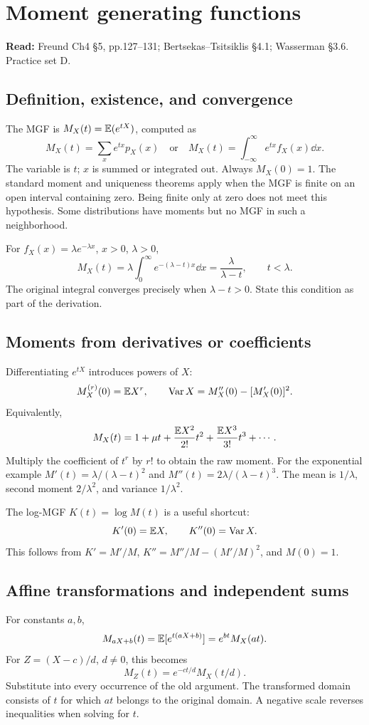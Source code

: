 \section{Moment generating functions}
\textbf{Read:} Freund Ch4 \S5, pp.127--131; Bertsekas--Tsitsiklis \S4.1; Wasserman \S3.6. Practice set D.
\subsection{Definition, existence, and convergence}
The MGF is $M_X(t)=\mathbb E(e^{tX})$, computed as
\[
M_X(t)=\sum_xe^{tx}p_X(x)\quad\text{or}\quad M_X(t)=\int_{-\infty}^{\infty}e^{tx}f_X(x)\dd x.
\]
The variable is $t$; $x$ is summed or integrated out. Always $M_X(0)=1$. The standard moment and uniqueness theorems apply when the MGF is finite on an open interval containing zero. Being finite only at zero does not meet this hypothesis. Some distributions have moments but no MGF in such a neighborhood.
\begin{example}
For $f_X(x)=\lambda e^{-\lambda x}$, $x>0$, $\lambda>0$,
\[
M_X(t)=\lambda\int_0^\infty e^{-(\lambda-t)x}\dd x=\frac{\lambda}{\lambda-t},\qquad t<\lambda.
\]
The original integral converges precisely when $\lambda-t>0$. State this condition as part of the derivation.
\end{example}
\subsection{Moments from derivatives or coefficients}
Differentiating $e^{tX}$ introduces powers of $X$:
\[
M_X^{(r)}(0)=\mathbb E X^r,\qquad\operatorname{Var} X=M_X''(0)-[M_X'(0)]^2.
\]
Equivalently,
\[
M_X(t)=1+\mu t+\frac{\mathbb E X^2}{2!}t^2+\frac{\mathbb E X^3}{3!}t^3+\cdots.
\]
Multiply the coefficient of $t^r$ by $r!$ to obtain the raw moment. For the exponential example $M'(t)=\lambda/(\lambda-t)^2$ and $M''(t)=2\lambda/(\lambda-t)^3$. The mean is $1/\lambda$, second moment $2/\lambda^2$, and variance $1/\lambda^2$.

The log-MGF $K(t)=\log M(t)$ is a useful shortcut:
\[
K'(0)=\mathbb E X,\qquad K''(0)=\operatorname{Var} X.
\]
This follows from $K'=M'/M$, $K''=M''/M-(M'/M)^2$, and $M(0)=1$.
\subsection{Affine transformations and independent sums}
For constants $a,b$,
\[
M_{aX+b}(t)=\mathbb E[e^{t(aX+b)}]=e^{bt}M_X(at).
\]
For $Z=(X-c)/d$, $d\ne0$, this becomes
\[
M_Z(t)=e^{-ct/d}M_X(t/d).
\]
Substitute into every occurrence of the old argument. The transformed domain consists of $t$ for which $at$ belongs to the original domain. A negative scale reverses inequalities when solving for $t$.

